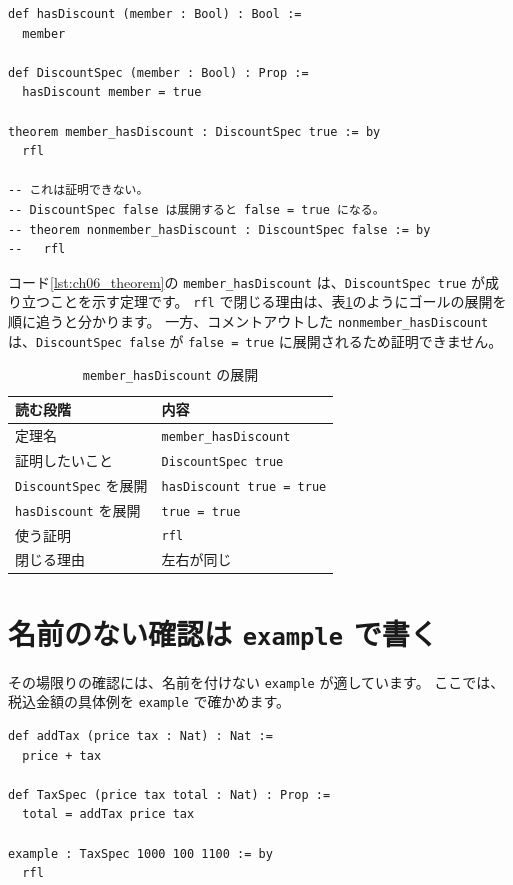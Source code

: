 \begin{listing}[htbp]
\begin{verbatim}
def hasDiscount (member : Bool) : Bool :=
  member

def DiscountSpec (member : Bool) : Prop :=
  hasDiscount member = true

theorem member_hasDiscount : DiscountSpec true := by
  rfl

-- これは証明できない。
-- DiscountSpec false は展開すると false = true になる。
-- theorem nonmember_hasDiscount : DiscountSpec false := by
--   rfl
\end{verbatim}
\caption{\texttt{member\_hasDiscount}}
\label{lst:ch06_theorem}
\end{listing}

コード\ref{lst:ch06_theorem}の \texttt{member\_hasDiscount} は、\texttt{DiscountSpec true} が成り立つことを示す定理です。
\texttt{rfl} で閉じる理由は、表\ref{tab:ch06-goal}のようにゴールの展開を順に追うと分かります。
一方、コメントアウトした \texttt{nonmember\_hasDiscount} は、\texttt{DiscountSpec false} が \texttt{false = true} に展開されるため証明できません。

\begin{table}[htbp]
\centering
\caption{\texttt{member\_hasDiscount} の展開}
\label{tab:ch06-goal}
\begin{tabular}{ll}
\toprule
読む段階 & 内容 \\
\midrule
定理名 & \texttt{member\_hasDiscount} \\
証明したいこと & \texttt{DiscountSpec true} \\
\texttt{DiscountSpec} を展開 & \texttt{hasDiscount true = true} \\
\texttt{hasDiscount} を展開 & \texttt{true = true} \\
使う証明 & \texttt{rfl} \\
閉じる理由 & 左右が同じ \\
\bottomrule
\end{tabular}
\end{table}

\section{名前のない確認は \texttt{example} で書く}

その場限りの確認には、名前を付けない \texttt{example} が適しています。
ここでは、税込金額の具体例を \texttt{example} で確かめます。

\begin{listing}[htbp]
\begin{verbatim}
def addTax (price tax : Nat) : Nat :=
  price + tax

def TaxSpec (price tax total : Nat) : Prop :=
  total = addTax price tax

example : TaxSpec 1000 100 1100 := by
  rfl
\end{verbatim}
\caption{\texttt{TaxSpec} の具体例}
\label{lst:ch06_example}
\end{listing}


